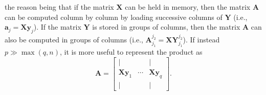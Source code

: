 \documentclass[10pt, twoside]{book}
\begin{document}
			the reason being that if the matrix $\mathbf{X}$ can be held in memory, then the matrix $\mathbf{A}$ can be computed column by column by loading successive columns of $\mathbf{Y}$ (i.e., $\mathbf{a}_j = \mathbf{X}\mathbf{y}_j$). If the matrix $\mathbf{Y}$ is stored in groups of columns, then the matrix $\mathbf{A}$ can also be computed in groups of columns  (i.e., $\mathbf{A}_{j_1}^{j_2} = \mathbf{X}\mathbf{Y}_{j_1}^{j_2}$). If instead $p \gg \max\left(q,n\right)$, it is more useful to represent the product as
			\begin{equation}
			\label{eq:MatrixProduct2}
				\mathbf{A} =
				\begin{bmatrix}
					\mid                   &        & \mid                   \\
					\mathbf{X}\mathbf{y}_1 & \cdots & \mathbf{X}\mathbf{y}_q \\
					\mid                   &        & \mid
				\end{bmatrix}.
			\end{equation}
			
	\backmatter
	
	
	
	
\end{document}
